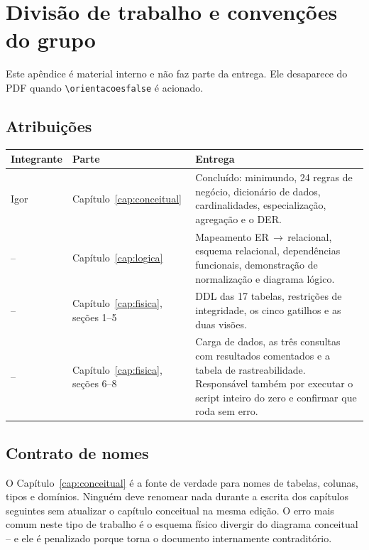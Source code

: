 \documentclass[a4paper,12pt,oneside,openany]{book}
\newif\iforientacoes
\begin{document}
\chapter{Divisão de trabalho e convenções do grupo}

Este apêndice é material interno e não faz parte da entrega. Ele desaparece do PDF
quando \verb|\orientacoesfalse| é acionado.

\section{Atribuições}

\begin{table}[H]
\centering
\small
\begin{tabularx}{\textwidth}{@{}llX@{}}
\toprule
\textbf{Integrante} & \textbf{Parte} & \textbf{Entrega} \\
\midrule
Igor & Capítulo~\ref{cap:conceitual} &
Concluído: minimundo, 24 regras de negócio, dicionário de dados, cardinalidades, especialização, agregação e o DER. \\
\addlinespace
-- & Capítulo~\ref{cap:logica} &
Mapeamento ER\,$\rightarrow$\,relacional, esquema relacional, dependências
funcionais, demonstração de normalização e diagrama lógico. \\
\addlinespace
-- & Capítulo~\ref{cap:fisica}, seções 1--5 &
DDL das 17 tabelas, restrições de integridade, os cinco gatilhos e as duas visões. \\
\addlinespace
-- & Capítulo~\ref{cap:fisica}, seções 6--8 &
Carga de dados, as três consultas com resultados comentados e a tabela de
rastreabilidade. Responsável também por executar o script inteiro do zero e
confirmar que roda sem erro. \\
\bottomrule
\end{tabularx}
\end{table}

\section{Contrato de nomes}

O Capítulo~\ref{cap:conceitual} é a fonte de verdade para nomes de tabelas,
colunas, tipos e domínios. Ninguém deve renomear nada durante a escrita dos
capítulos seguintes sem atualizar o capítulo conceitual na mesma edição. O erro
mais comum neste tipo de trabalho é o esquema físico divergir do diagrama
conceitual -- e ele é penalizado porque torna o documento internamente
contraditório.
\end{document}
